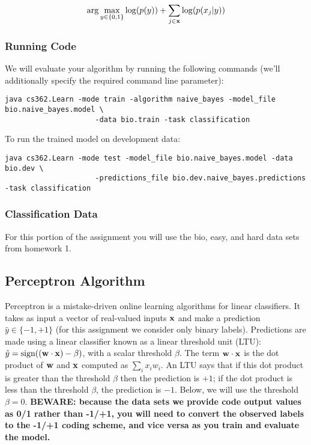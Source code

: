 \documentclass[11pt]{article}
\newcommand{\vw}{{\bf w}}
\newcommand{\vx}{{\bf x}}
\newcommand{\yh}{\hat{y}}
\begin{document}
\begin{displaymath}
\arg\max_{y \in \{0,1\}} \log(p(y)) +  \sum_{j \in \vx} \log(p(x_j | y))
\end{displaymath}


\subsubsection{Running Code}
We will evaluate your algorithm by running the following commands (we'll additionally specify the required command line parameter):
\begin{footnotesize}
\begin{verbatim}
java cs362.Learn -mode train -algorithm naive_bayes -model_file bio.naive_bayes.model \
                     -data bio.train -task classification
\end{verbatim}
\end{footnotesize}
To run the trained model on development data:
\begin{footnotesize}
\begin{verbatim}
java cs362.Learn -mode test -model_file bio.naive_bayes.model -data bio.dev \
                     -predictions_file bio.dev.naive_bayes.predictions -task classification
\end{verbatim}
\end{footnotesize}

\subsubsection{Classification Data}

For this portion of the assignment you will use the bio, easy, and hard data sets from
homework 1.

\subsection{Perceptron Algorithm}

Perceptron is a mistake-driven online learning algorithms for linear
classifiers. It takes as input a vector of real-valued inputs $\vx$
and make a prediction $\yh \in \{-1,+1\}$ (for this assignment we
consider only binary labels). Predictions are made using a linear
classifier known as a linear threshold unit (LTU): $\yh =
\textrm{sign}((\vw \cdot \vx) - \beta)$, with a scalar threshold
$\beta$. The term $\vw \cdot \vx$ is the dot product of $\vw$ and
$\vx$ computed as $\sum_i x_i  w_i$. An LTU says that if this dot
product is greater than the threshold $\beta$ then the prediction is
$+1$; if the dot product is less than the threshold $\beta$, the
prediction is $-1$.
Below, we will use the threshold $\beta = 0$.
{\bf BEWARE: because the data sets we provide code output values as 0/1 rather
than -1/+1, you will need to convert the observed labels to the -1/+1
coding scheme, and vice versa as you train and evaluate the model.}
\end{document}
